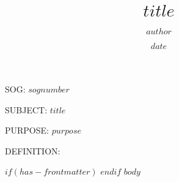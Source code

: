\documentclass[12pt]{sog}
\title{$title$}
\date{$date$}
\author{$author$}
\begin{document}
\maketitle

\par SOG: $sognumber$

\par SUBJECT: $title$

\par PURPOSE: $purpose$

\par DEFINITION:

$if(has-frontmatter)$
\mainmatter
$endif$
$body$
\end{document}
